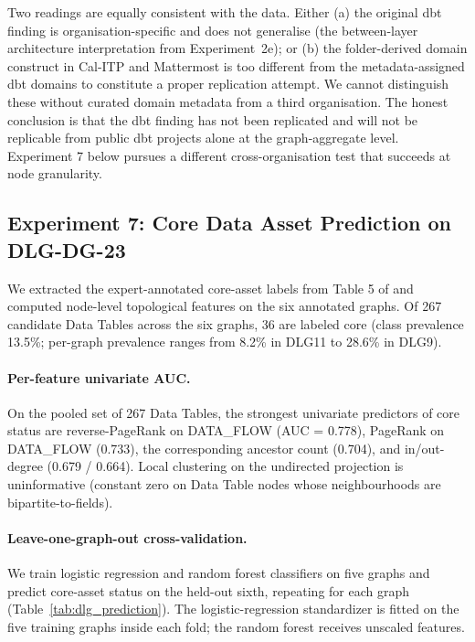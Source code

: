 \documentclass[11pt,a4paper]{article}
\begin{document}
Two readings are equally consistent with the data. Either (a) the original
dbt finding is organisation-specific and does not generalise (the
between-layer architecture interpretation from Experiment~2e); or (b)
the folder-derived domain construct in Cal-ITP and Mattermost is too
different from the metadata-assigned dbt domains to constitute a
proper replication attempt. We cannot distinguish these without
curated domain metadata from a third organisation. The honest
conclusion is that the dbt finding has not been replicated and will
not be replicable from public dbt projects alone at the graph-aggregate
level. Experiment 7 below pursues a different cross-organisation test
that succeeds at node granularity.

\subsection{Experiment 7: Core Data Asset Prediction on DLG-DG-23}

We extracted the expert-annotated core-asset labels from Table 5 of
\citet{chen2024dlgdg} and computed node-level topological features on
the six annotated graphs. Of 267 candidate Data Tables across the six
graphs, 36 are labeled core (class prevalence 13.5\%; per-graph
prevalence ranges from 8.2\% in DLG11 to 28.6\% in DLG9).

\paragraph{Per-feature univariate AUC.}
On the pooled set of 267 Data Tables, the strongest univariate
predictors of core status are reverse-PageRank on DATA\_FLOW (AUC =
0.778), PageRank on DATA\_FLOW (0.733), the corresponding ancestor count
(0.704), and in/out-degree (0.679 / 0.664). Local clustering on the
undirected projection is uninformative (constant zero on Data Table
nodes whose neighbourhoods are bipartite-to-fields).

\paragraph{Leave-one-graph-out cross-validation.}
We train logistic regression and random forest classifiers on five
graphs and predict core-asset status on the held-out sixth, repeating
for each graph (Table~\ref{tab:dlg_prediction}). The logistic-regression
standardizer is fitted on the five training graphs inside each fold;
the random forest receives unscaled features.
\end{document}
